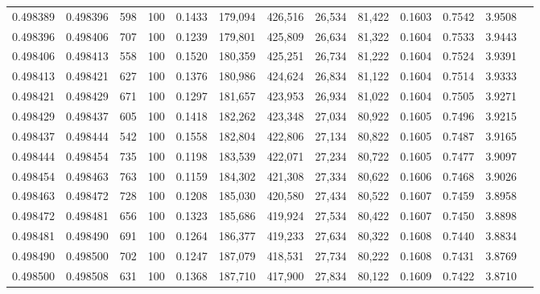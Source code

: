 \begin{tabular}{rrrrrrrrrrrrr}
0.498389 & 0.498396 &   598 & 100 &                                     0.1433 & 179,094 & 426,516 &  26,534 &  81,422 & 0.1603 & 0.7542 & 3.9508 \\
0.498396 & 0.498406 &   707 & 100 &                                     0.1239 & 179,801 & 425,809 &  26,634 &  81,322 & 0.1604 & 0.7533 & 3.9443 \\
0.498406 & 0.498413 &   558 & 100 &                                     0.1520 & 180,359 & 425,251 &  26,734 &  81,222 & 0.1604 & 0.7524 & 3.9391 \\
0.498413 & 0.498421 &   627 & 100 &                                     0.1376 & 180,986 & 424,624 &  26,834 &  81,122 & 0.1604 & 0.7514 & 3.9333 \\
0.498421 & 0.498429 &   671 & 100 &                                     0.1297 & 181,657 & 423,953 &  26,934 &  81,022 & 0.1604 & 0.7505 & 3.9271 \\
0.498429 & 0.498437 &   605 & 100 &                                     0.1418 & 182,262 & 423,348 &  27,034 &  80,922 & 0.1605 & 0.7496 & 3.9215 \\
0.498437 & 0.498444 &   542 & 100 &                                     0.1558 & 182,804 & 422,806 &  27,134 &  80,822 & 0.1605 & 0.7487 & 3.9165 \\
0.498444 & 0.498454 &   735 & 100 &                                     0.1198 & 183,539 & 422,071 &  27,234 &  80,722 & 0.1605 & 0.7477 & 3.9097 \\
0.498454 & 0.498463 &   763 & 100 &                                     0.1159 & 184,302 & 421,308 &  27,334 &  80,622 & 0.1606 & 0.7468 & 3.9026 \\
0.498463 & 0.498472 &   728 & 100 &                                     0.1208 & 185,030 & 420,580 &  27,434 &  80,522 & 0.1607 & 0.7459 & 3.8958 \\
0.498472 & 0.498481 &   656 & 100 &                                     0.1323 & 185,686 & 419,924 &  27,534 &  80,422 & 0.1607 & 0.7450 & 3.8898 \\
0.498481 & 0.498490 &   691 & 100 &                                     0.1264 & 186,377 & 419,233 &  27,634 &  80,322 & 0.1608 & 0.7440 & 3.8834 \\
0.498490 & 0.498500 &   702 & 100 &                                     0.1247 & 187,079 & 418,531 &  27,734 &  80,222 & 0.1608 & 0.7431 & 3.8769 \\
0.498500 & 0.498508 &   631 & 100 &                                     0.1368 & 187,710 & 417,900 &  27,834 &  80,122 & 0.1609 & 0.7422 & 3.8710 \\

\end{tabular}

